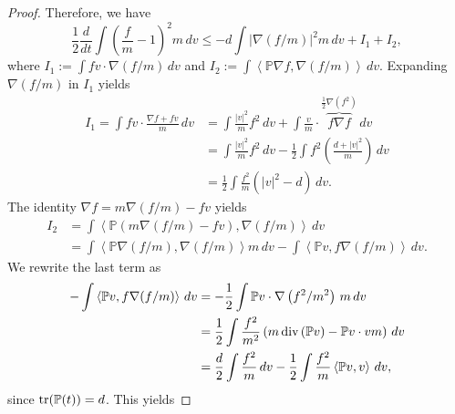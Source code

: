 \documentclass[11pt]{amsart}
\numberwithin{equation}{section}
\begin{document}
\begin{proof}
  Therefore, we have
  \begin{equation*}
    \frac{1}{2}\frac{d}{dt}\int\left(\frac{f}{ m }-1\right)^{2} m\,dv \leq
    -d\int\left\vert \nabla\left(f/ m \right) \right\vert ^{2} m\,dv + I_1 + I_2,
  \end{equation*}
  where $I_1 := \int fv\cdot\nabla(f/ m )\,dv$ and $I_2 :=\int\left\langle \mathbb{P}\nabla f,\nabla(f/ m ) \right\rangle\,dv$. Expanding $\nabla (f/m)$ in $I_1$ yields
  \begin{align*}
    I_1 =\int fv\cdot\frac{\nabla f+fv}{ m }\,dv & =\int\frac{\left\vert v \right\vert ^{2}}{ m }f^{2}\,dv+\int\frac{v}{ m }\cdot\overbrace{f\nabla f}^{\frac{1}{2}\nabla(f^{2})}\,dv\\
     & =\int\frac{\left\vert v \right\vert ^{2}}{ m }f^{2}\,dv-\frac{1}{2}\int f^{2}\left(\frac{d+\left\vert v \right\vert ^{2}}{ m }\right)\,dv \\
     & =\frac{1}{2}\int\frac{f^{2}}{ m }\left(\left\vert v \right\vert ^{2}-d\right)\,dv.
  \end{align*}
  The identity $\nabla f= m \nabla(f/ m )-fv$ yields 
  \begin{align*}
    I_2 &	=\int\left\langle  \mathbb{P} \left( m \nabla(f/ m )-fv\right),\nabla(f/ m ) \right\rangle \,dv\\
    & = \int\left\langle  \mathbb{P} \nabla(f/ m ),\nabla(f/ m ) \right\rangle  m \,dv -\int\left\langle  \mathbb{P} v,f\nabla(f/ m ) \right\rangle\,dv .
  \end{align*}
  We rewrite the last term as 
  \begin{align*}
    -\int\left\langle  \mathbb{P} v,f\nabla(f/ m ) \right\rangle\,dv  & =-\frac{1}{2}\int \mathbb{P} v\cdot\nabla\left(f^{2}/ m ^{2}\right)\, m\,dv \\
     & =\frac{1}{2}\int\frac{f^{2}}{ m ^{2}}\left( m \,\textnormal{div}\left( \mathbb{P} v\right)- \mathbb{P} v\cdot v m \right)\,dv\\
     & =\frac{d}{2}\int\frac{f^{2}}{ m }\,dv-\frac{1}{2}\int\frac{f^{2}}{ m }\left\langle  \mathbb{P} v,v \right\rangle\,dv ,
  \end{align*}
  since $\textnormal{tr}( \mathbb{P}(t)) = d$.  This yields

\end{proof}
\end{document}
